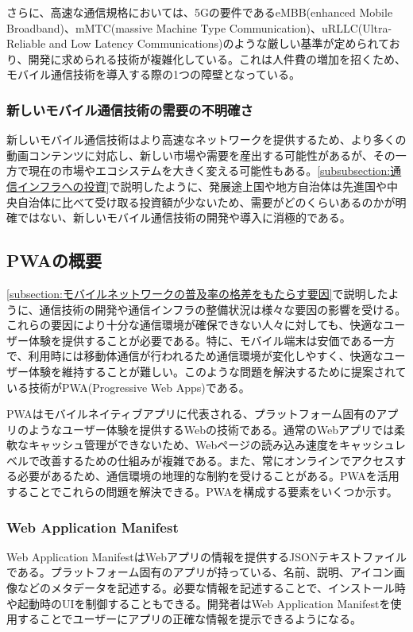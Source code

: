 さらに、高速な通信規格においては、5Gの要件であるeMBB(enhanced Mobile Broadband)、mMTC(massive Machine Type Communication)、uRLLC(Ultra-Reliable and Low Latency Communications)のような厳しい基準が定められており、開発に求められる技術が複雑化している。これは人件費の増加を招くため、モバイル通信技術を導入する際の1つの障壁となっている。
\subsubsection{新しいモバイル通信技術の需要の不明確さ}\label{subsubsection:新しいモバイル通信技術の需要の不明確さ}
新しいモバイル通信技術はより高速なネットワークを提供するため、より多くの動画コンテンツに対応し、新しい市場や需要を産出する可能性があるが、その一方で現在の市場やエコシステムを大きく変える可能性もある。\autoref{subsubsection:通信インフラへの投資}で説明したように、発展途上国や地方自治体は先進国や中央自治体に比べて受け取る投資額が少ないため、需要がどのくらいあるのかが明確ではない、新しいモバイル通信技術の開発や導入に消極的である。
\subsection{PWAの概要}\label{subsection:PWAの概要}
\autoref{subsection:モバイルネットワークの普及率の格差をもたらす要因}で説明したように、通信技術の開発や通信インフラの整備状況は様々な要因の影響を受ける。これらの要因により十分な通信環境が確保できない人々に対しても、快適なユーザー体験を提供することが必要である。特に、モバイル端末は安価である一方で、利用時には移動体通信が行われるため通信環境が変化しやすく、快適なユーザー体験を維持することが難しい。このような問題を解決するために提案されている技術がPWA(Progressive Web Apps)である。

PWAはモバイルネイティブアプリに代表される、プラットフォーム固有のアプリのようなユーザー体験を提供するWebの技術である。通常のWebアプリでは柔軟なキャッシュ管理ができないため、Webページの読み込み速度をキャッシュレベルで改善するための仕組みが複雑である。また、常にオンラインでアクセスする必要があるため、通信環境の地理的な制約を受けることがある。PWAを活用することでこれらの問題を解決できる。PWAを構成する要素をいくつか示す。
\subsubsection{Web Application Manifest}\label{subsubsection:Web Application Manifest}
Web Application ManifestはWebアプリの情報を提供するJSONテキストファイルである。プラットフォーム固有のアプリが持っている、名前、説明、アイコン画像などのメタデータを記述する。必要な情報を記述することで、インストール時や起動時のUIを制御することもできる。開発者はWeb Application Manifestを使用することでユーザーにアプリの正確な情報を提示できるようになる。
